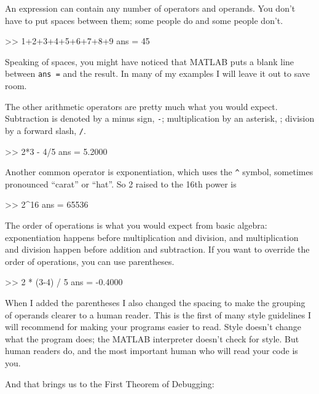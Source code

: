 \documentclass[main.tex]{subfiles}
\begin{document}
An expression can contain any number of operators and operands.  You
don't have to put spaces between them; some people do and some people
don't.

\begin{code}
>> 1+2+3+4+5+6+7+8+9
ans = 45
\end{code}

Speaking of spaces, you might have noticed that MATLAB puts a blank
line between {\tt ans =} and the result.  In many of my examples I will leave it out to save room.


The other arithmetic operators are pretty much what you would expect.
Subtraction is denoted by a minus sign, {\tt -}; multiplication by
an asterisk, {\tt *}; division by a forward slash, {\tt /}.

\begin{code}
>> 2*3 - 4/5
ans = 5.2000
\end{code}

Another common operator is exponentiation, which uses the \verb+^+
symbol, sometimes pronounced ``carat'' or ``hat''.  So 2 raised to the
16th power is

\begin{code}
>> 2^16
ans = 65536
\end{code}

The order of operations is what you would expect from basic algebra:
exponentiation happens before multiplication and division, and multiplication and division happen before addition and subtraction.
If you want to override the order of operations, you can use parentheses.


\begin{code}
>> 2 * (3-4) / 5
ans = -0.4000
\end{code}

When I added the parentheses I also changed the spacing to make the
grouping of operands clearer to a human reader.  This is the first
of many style guidelines I will recommend for making your programs
easier to read.  Style doesn't change what the program does; the MATLAB
interpreter doesn't check for style.  But human readers do, and the
most important human who will read your code is you.


And that brings us to the First Theorem of Debugging:
\end{document}
